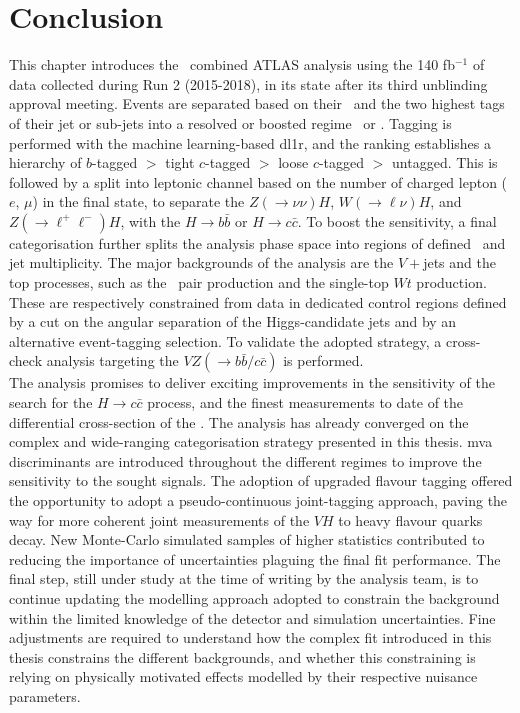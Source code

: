 \section{Conclusion}
This chapter introduces the \vhbc\ combined ATLAS analysis using the 140 fb$^{-1}$ of data collected during Run 2 (2015-2018), in its state after its third unblinding approval meeting. Events are separated based on their \ptv\ and the two highest tags of their jet or sub-jets into a resolved or boosted regime \vhb\ or \vhc. Tagging is performed with the machine learning-based \gls{dl1r}, and the ranking establishes a hierarchy of $b$-tagged $>$ tight $c$-tagged $>$ loose $c$-tagged $>$ untagged. This is followed by a split into leptonic channel based on the number of charged lepton ($e$, $\mu$) in the final state, to separate the $Z(\rightarrow \nu\nu)H$, $W(\rightarrow \ell\nu)H$, and $Z(\rightarrow \ell^+\ell^-)H$, with the $H \rightarrow b\bar{b}$ or $H \rightarrow c\bar{c}$. To boost the sensitivity, a final categorisation further splits the analysis phase space into regions of defined \ptv\ and jet multiplicity. The major backgrounds of the analysis are the $V+$jets and the top processes, such as the \ttb\ pair production and the single-top $Wt$ production. These are respectively constrained from data in dedicated control regions defined by a cut on the angular separation of the Higgs-candidate jets and by an alternative event-tagging selection. To validate the adopted strategy, a cross-check analysis targeting the $VZ (\rightarrow b\bar{b}/c\bar{c})$ is performed. \\

The analysis promises to deliver exciting improvements in the sensitivity of the search for the $H\rightarrow c\bar{c}$ process, and the finest measurements to date of the differential cross-section of the \vhb. The analysis has already converged on the complex and wide-ranging categorisation strategy presented in this thesis. \gls{mva} discriminants are introduced throughout the different regimes to improve the sensitivity to the sought signals. The adoption of upgraded flavour tagging offered the opportunity to adopt a pseudo-continuous joint-tagging approach, paving the way for more coherent joint measurements of the $VH$ to heavy flavour quarks decay. New Monte-Carlo simulated samples of higher statistics contributed to reducing the importance of uncertainties plaguing the final fit performance. The final step, still under study at the time of writing by the analysis team, is to continue updating the modelling approach adopted to constrain the background within the limited knowledge of the detector and simulation uncertainties. Fine adjustments are required to understand how the complex fit introduced in this thesis constrains the different backgrounds, and whether this constraining is relying on physically motivated effects modelled by their respective nuisance parameters.\\

